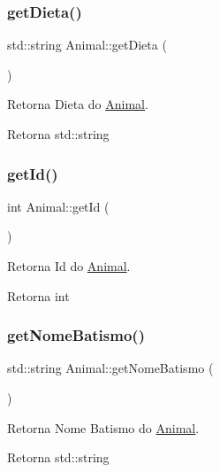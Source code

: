 \subsubsection{\texorpdfstring{get\+Dieta()}{getDieta()}}
{\footnotesize\ttfamily std\+::string Animal\+::get\+Dieta (\begin{DoxyParamCaption}{ }\end{DoxyParamCaption})}



Retorna Dieta do \hyperlink{classAnimal}{Animal}. 

\begin{DoxyReturn}{Retorna}
std\+::string 
\end{DoxyReturn}
\mbox{\label{classAnimal_a2c27e56355bc2b40d65250da2bb8a102}} 
\subsubsection{\texorpdfstring{get\+Id()}{getId()}}
{\footnotesize\ttfamily int Animal\+::get\+Id (\begin{DoxyParamCaption}{ }\end{DoxyParamCaption})}



Retorna Id do \hyperlink{classAnimal}{Animal}. 

\begin{DoxyReturn}{Retorna}
int 
\end{DoxyReturn}
\mbox{\label{classAnimal_aee0219bd596f0af49fa51fcdad29a1a7}} 
\subsubsection{\texorpdfstring{get\+Nome\+Batismo()}{getNomeBatismo()}}
{\footnotesize\ttfamily std\+::string Animal\+::get\+Nome\+Batismo (\begin{DoxyParamCaption}{ }\end{DoxyParamCaption})}



Retorna Nome Batismo do \hyperlink{classAnimal}{Animal}. 

\begin{DoxyReturn}{Retorna}
std\+::string 
\end{DoxyReturn}
\mbox{\label{classAnimal_a9b316bf80a121cd5dc077158055c162f}} 
